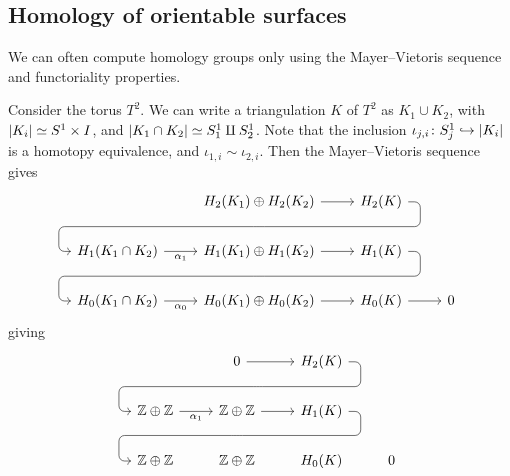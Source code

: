 \subsection{Homology of orientable surfaces}
We can often compute homology groups only using the Mayer--Vietoris sequence and functoriality properties.
\begin{example}
	Consider the torus \( T^2 \).
	We can write a triangulation \( K \) of \( T^2 \) as \( K_1 \cup K_2 \), with \( \abs{K_i} \simeq S^1 \times I \), and \( \abs{K_1 \cap K_2} \simeq S_1^1 \amalg S_2^1 \).
	Note that the inclusion \( \iota_{j,i} \colon S_j^1 \hookrightarrow \abs{K_i} \) is a homotopy equivalence, and \( \iota_{1,i} \sim \iota_{2,i} \).
	Then the Mayer--Vietoris sequence gives
	\[\begin{tikzcd}
		& {H_2(K_1)\oplus H_2(K_2)} \ar[draw=none]{d}[name=X, anchor=center]{} & {H_2(K)} \ar[rounded corners,
		to path={ -- ([xshift=2ex]\tikztostart.east)
				  |- (X.center) \tikztonodes
				  -| ([xshift=-2ex]\tikztotarget.west)
				  -- (\tikztotarget)}]{dll} \\
		{H_1(K_1 \cap K_2)} & {H_1(K_1) \oplus H_1(K_2)} \ar[draw=none]{d}[name=Y, anchor=center]{} & {H_1(K)} \ar[rounded corners,
		to path={ -- ([xshift=2ex]\tikztostart.east)
				  |- (Y.center) \tikztonodes
				  -| ([xshift=-2ex]\tikztotarget.west)
				  -- (\tikztotarget)}]{dll} \\
		{H_0(K_1 \cap K_2)} & {H_0(K_1) \oplus H_0(K_2)} & {H_0(K)} & 0
		\arrow[from=1-2, to=1-3]
		\arrow["{\alpha_1}"', from=2-1, to=2-2]
		\arrow[from=2-2, to=2-3]
		\arrow["{\alpha_0}"', from=3-1, to=3-2]
		\arrow[from=3-2, to=3-3]
		\arrow[from=3-3, to=3-4]
	\end{tikzcd}\]
	giving
	\[\begin{tikzcd}
		& 0 \ar[draw=none]{d}[name=Y, anchor=center]{} & {H_2(K)} \ar[rounded corners,
		to path={ -- ([xshift=2ex]\tikztostart.east)
				  |- (X.center) \tikztonodes
				  -| ([xshift=-2ex]\tikztotarget.west)
				  -- (\tikztotarget)}]{dll} \\
		{\mathbb Z \oplus \mathbb Z} & {\mathbb Z \oplus \mathbb Z} \ar[draw=none]{d}[name=Y, anchor=center]{} & {H_1(K)} \ar[rounded corners,
		to path={ -- ([xshift=2ex]\tikztostart.east)
				  |- (Y.center) \tikztonodes
				  -| ([xshift=-2ex]\tikztotarget.west)
				  -- (\tikztotarget)}]{dll} \\
		{\mathbb Z \oplus \mathbb Z} & {\mathbb Z \oplus \mathbb Z} & {H_0(K)} & 0
		\arrow[from=1-2, to=1-3]
		\arrow["{\alpha_1}"', from=2-1, to=2-2]
		\arrow[from=2-2, to=2-3]

\end{tikzcd}\]
\end{example}
